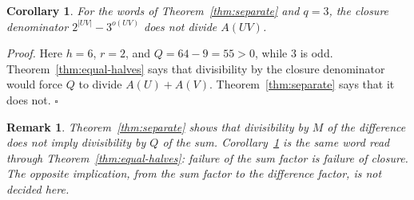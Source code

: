 \documentclass[11pt,letterpaper]{article}
\newtheorem{corollary}[theorem]{Corollary}
\newtheorem{remark}[theorem]{Remark}
\newenvironment{proof}{\noindent\textit{Proof.}}{\hfill\(\square\)}
\begin{document}
\begin{corollary}
\label{cor:not-closed}
For the words of Theorem~\ref{thm:separate} and \(q=3\), the closure denominator \(2^{|UV|}-3^{o(UV)}\) does not divide \(A(UV)\).
\end{corollary}

\begin{proof}
Here \(h=6\), \(r=2\), and \(Q=64-9=55>0\), while \(3\) is odd. Theorem~\ref{thm:equal-halves} says that divisibility by the closure denominator would force \(Q\) to divide \(A(U)+A(V)\). Theorem~\ref{thm:separate} says that it does not.
\end{proof}

\begin{remark}
Theorem~\ref{thm:separate} shows that divisibility by \(M\) of the difference does not imply divisibility by \(Q\) of the sum. Corollary~\ref{cor:not-closed} is the same word read through Theorem~\ref{thm:equal-halves}: failure of the sum factor is failure of closure. The opposite implication, from the sum factor to the difference factor, is not decided here.
\end{remark}
\end{document}
